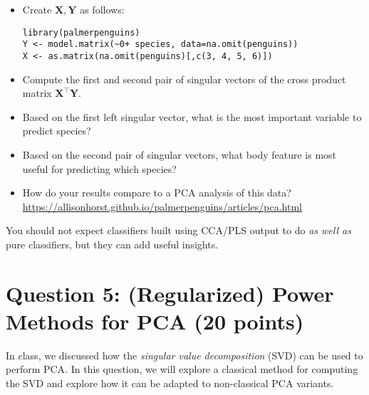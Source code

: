 \documentclass[10pt]{article}
\newcommand{\bX}{\bm{X}}
\newcommand{\bY}{\bm{Y}}
\begin{document}
\begin{itemize}
    \item Create $\bX, \bY$ as follows:
    \begin{verbatim}
library(palmerpenguins)
Y <- model.matrix(~0+ species, data=na.omit(penguins))
X <- as.matrix(na.omit(penguins)[,c(3, 4, 5, 6)])
    \end{verbatim}
    \item Compute the first and second pair of singular vectors of the cross product matrix $\bX^{\top}\bY$.
    \item Based on the first left singular vector, what is the most important variable to predict species?
    \item Based on the second pair of singular vectors, what body feature is most useful for predicting which species? 
    \item How do your results compare to a PCA analysis of this data? \url{https://allisonhorst.github.io/palmerpenguins/articles/pca.html}
\end{itemize}
You should not expect classifiers built using CCA/PLS output to do \emph{as well as} pure classifiers, but they can add useful insights. 

\section*{Question 5: (Regularized) Power Methods for PCA (20 points)}

In class, we discussed how the \emph{singular value decomposition} (SVD) can be used to perform PCA. In this question, we will explore a classical method for computing the SVD and explore how it can be adapted to non-classical PCA variants. 
\end{document}
